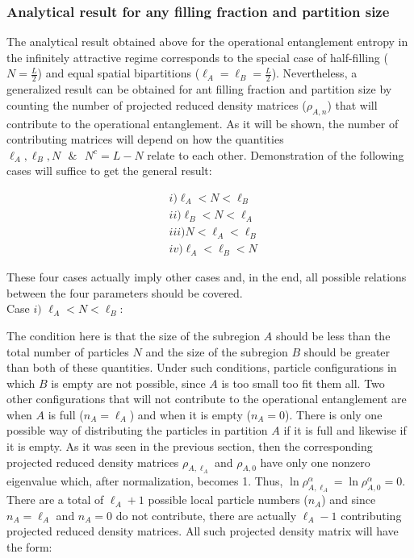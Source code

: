 \subsubsection{Analytical result for any filling fraction and partition size}

The analytical result obtained above for the operational entanglement entropy in the infinitely attractive regime corresponds to the special case of half-filling ($N = \frac{L}{2}$) and equal spatial bipartitions ($\ell_{A} = \ell_{B} = \frac{L}{2}$). Nevertheless, a generalized result can be obtained for ant filling fraction and partition size by counting the number of projected reduced density matrices ($\rho_{A,n}$) that will contribute to the operational entanglement. As it will be shown, the number of contributing matrices will depend on how the quantities $\ell_{A}, \ell_{B}, N \text{ } \&  \text{ }N^{c} = L-N$ relate to each other. Demonstration of the following cases will suffice to get the general result:

\begin{align}
&i) \ell_{A} < N < \ell_{B} \\
&ii) \ell_{B} < N < \ell_{A} \\
&iii)  N < \ell_{A} < \ell_{B} \\
&iv) \ell_{A} < \ell_{B} < N
\end{align}

These four cases actually imply other cases and, in the end, all possible relations between the four parameters should be covered. \\

Case $i)$ $\ell_{A} < N < \ell_{B}$:

The condition here is that the size of the subregion $A$ should be less than the total number of particles $N$ and the size of the subregion $B$ should be greater than both of these quantities. Under such conditions, particle configurations in which $B$ is empty are not possible, since $A$ is too small too fit them all. Two other configurations that will not contribute to the operational entanglement are when $A$ is full ($n_{A} = \ell_{A}$) and when it is empty ($n_{A} = 0$). There is only one possible way of distributing the particles in partition $A$ if it is full and likewise if it is empty. As it was seen in the previous section, then the corresponding projected reduced density matrices $\rho_{A,\ell_{A}}$ and $\rho_{A,0}$ have only one nonzero eigenvalue which, after normalization, becomes 1. Thus, $\ln \rho_{A,\ell_{A}}^{\alpha} = \ln \rho_{A,0}^{\alpha} = 0$. There are a total of $\ell_{A}+1$ possible local particle numbers ($n_{A}$) and since $n_{A} = \ell_{A}$ and $n_{A} = 0$ do not contribute, there are actually $\ell_{A}-1$ contributing projected reduced density matrices. All such projected density matrix will have the form:

